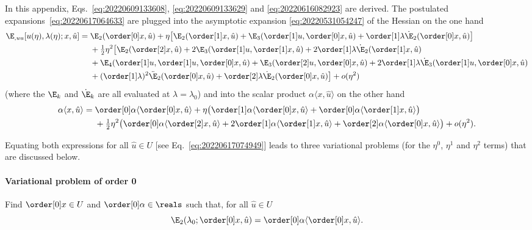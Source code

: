 In this appendix, Eqs.~\eqref{eq:20220609133608}, \eqref{eq:20220609133629} and \eqref{eq:20220616082923} are
derived. The postulated expansions~\eqref{eq:20220617064633} are plugged into the asymptotic expansion
\eqref{eq:20220531054247} of the Hessian on the one hand
\begin{equation*}
  \begin{aligned}[b]
    \E_{, uu} [u(\eta), \lambda(\eta); x, \hat{u}] ={}
    & \E_2(\order[0]x, \hat{u}) + \eta \bigl[ \E_2(\order[1]x, \hat{u}) + \E_3(\order[1]u, \order[0]x, \hat{u}) + \order[1]\lambda \dot{\E}_2(\order[0]x, \hat{u})\bigr]\\
    & + \tfrac{1}{2} \eta^2 \bigl[\E_2(\order[2]x, \hat{u}) + 2\E_3(\order[1]u, \order[1]x, \hat{u}) + 2 \order[1]\lambda \dot{\E}_2(\order[1]x, \hat{u})\\
    & + \E_4(\order[1]u, \order[1]u, \order[0]x, \hat{u}) + \E_3(\order[2]u, \order[0]x, \hat{u}) + 2\order[1]\lambda \dot{\E}_3(\order[1]u, \order[0]x, \hat{u})\\
    & + ( \order[1]\lambda )^2 \ddot{\E}_2(\order[0]x, \hat{u}) + \order[2]\lambda \dot{\E}_2(\order[0]x, \hat{u}) \bigr] + o(\eta^2)
  \end{aligned}
\end{equation*}
(where the $\E_k$ and $\dot{\E}_k$ are all evaluated at $\lambda=\lambda_0$) and into the scalar product
$\alpha \langle x, \hat{u} \rangle$ on the other hand
\begin{equation*}
  \begin{aligned}[b]
    \alpha \langle x, \hat{u} \rangle ={}
    & \order[0]\alpha \langle \order[0]x, \hat{u} \rangle + \eta \bigl(\order[1]\alpha \langle \order[0]x, \hat{u} \rangle + \order[0]\alpha \langle \order[1]x, \hat{u} \rangle\bigr)\\
    & + \tfrac{1}{2} \eta^2 \bigl(\order[0]\alpha \langle \order[2]x, \hat{u} \rangle + 2 \order[1]\alpha \langle \order[1]x, \hat{u} \rangle + \order[2]\alpha \langle \order[0]x, \hat{u} \rangle\bigr) + o(\eta^2).
  \end{aligned}
\end{equation*}

Equating both expressions for all $\hat{u} \in U$ [see Eq.~\eqref{eq:20220617074949}] leads to three variational
problems (for the $\eta^0$, $\eta^1$ and $\eta^2$ terms) that are discussed below.

\paragraph{Variational problem of order 0} Find $\order[0]x \in U$ and $\order[0]\alpha\in\reals$ such
that, for all $\hat{u} \in U$
\begin{equation*}
  \E_2(\lambda_0; \order[0]x, \hat{u}) = \order[0]\alpha \langle \order[0]x, \hat{u} \rangle.
\end{equation*}

